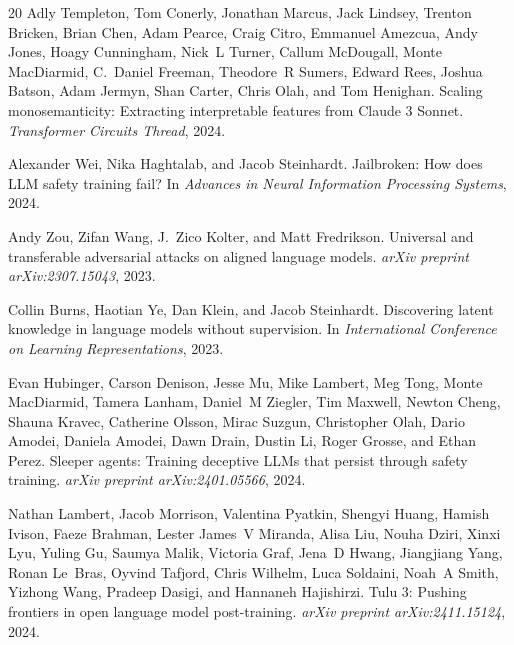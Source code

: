\documentclass[10pt,twocolumn]{article}
\begin{document}
\begin{thebibliography}{20}
Adly Templeton, Tom Conerly, Jonathan Marcus, Jack Lindsey, Trenton Bricken, Brian Chen, Adam Pearce, Craig Citro, Emmanuel Amezcua, Andy Jones, Hoagy Cunningham, Nick~L Turner, Callum McDougall, Monte MacDiarmid, C.~Daniel Freeman, Theodore~R Sumers, Edward Rees, Joshua Batson, Adam Jermyn, Shan Carter, Chris Olah, and Tom Henighan.
\newblock Scaling monosemanticity: Extracting interpretable features from {C}laude 3 {S}onnet.
\newblock \emph{Transformer Circuits Thread}, 2024.

Alexander Wei, Nika Haghtalab, and Jacob Steinhardt.
\newblock Jailbroken: How does {LLM} safety training fail?
\newblock In \emph{Advances in Neural Information Processing Systems}, 2024.

Andy Zou, Zifan Wang, J.~Zico Kolter, and Matt Fredrikson.
\newblock Universal and transferable adversarial attacks on aligned language models.
\newblock \emph{arXiv preprint arXiv:2307.15043}, 2023.

Collin Burns, Haotian Ye, Dan Klein, and Jacob Steinhardt.
\newblock Discovering latent knowledge in language models without supervision.
\newblock In \emph{International Conference on Learning Representations}, 2023.

Evan Hubinger, Carson Denison, Jesse Mu, Mike Lambert, Meg Tong, Monte MacDiarmid, Tamera Lanham, Daniel~M Ziegler, Tim Maxwell, Newton Cheng, Shauna Kravec, Catherine Olsson, Mirac Suzgun, Christopher Olah, Dario Amodei, Daniela Amodei, Dawn Drain, Dustin Li, Roger Grosse, and Ethan Perez.
\newblock Sleeper agents: Training deceptive {LLM}s that persist through safety training.
\newblock \emph{arXiv preprint arXiv:2401.05566}, 2024.

Nathan Lambert, Jacob Morrison, Valentina Pyatkin, Shengyi Huang, Hamish Ivison, Faeze Brahman, Lester James~V Miranda, Alisa Liu, Nouha Dziri, Xinxi Lyu, Yuling Gu, Saumya Malik, Victoria Graf, Jena~D Hwang, Jiangjiang Yang, Ronan Le~Bras, Oyvind Tafjord, Chris Wilhelm, Luca Soldaini, Noah~A Smith, Yizhong Wang, Pradeep Dasigi, and Hannaneh Hajishirzi.
\newblock Tulu 3: Pushing frontiers in open language model post-training.
\newblock \emph{arXiv preprint arXiv:2411.15124}, 2024.


\end{thebibliography}
\end{document}
